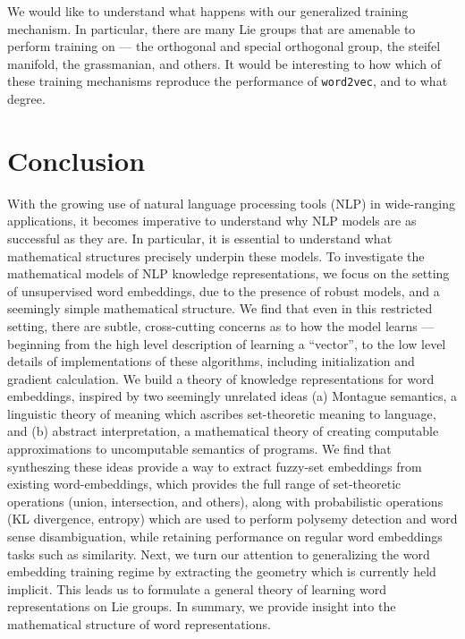 \documentclass[11pt]{book}
\begin{document}
We would like to understand what happens with our generalized training mechanism. In particular, there are many Lie groups that are amenable to perform training on --- the orthogonal and special orthogonal group, the steifel manifold, the grassmanian, and others. It would be interesting to how which of these training mechanisms reproduce the performance of \texttt{word2vec}, and to what degree.


\chapter{Conclusion}

With the growing use of natural language processing tools (NLP) in wide-ranging applications, it becomes imperative to understand why NLP models are as successful as they are. In particular, it is essential to understand what mathematical structures precisely underpin these models. To investigate the mathematical models of NLP knowledge representations, we focus on the setting of unsupervised word embeddings, due to the presence of robust models, and a seemingly simple mathematical structure. We find that even in this restricted setting, there are subtle, cross-cutting concerns as to how the model learns --- beginning from the high level description of learning a ``vector'', to the low level details of implementations of these algorithms, including initialization and gradient calculation. We build a theory of knowledge representations for word embeddings, inspired by two seemingly unrelated ideas (a) Montague semantics, a linguistic theory of meaning which ascribes set-theoretic meaning to language, and (b) abstract interpretation, a  mathematical theory of creating computable approximations to uncomputable semantics of programs. We find that syntheszing these ideas provide a way to extract fuzzy-set embeddings from existing word-embeddings, which provides the full range of set-theoretic operations (union, intersection, and others), along with probabilistic operations (KL divergence, entropy) which are used to perform polysemy detection and word sense disambiguation, while retaining performance on regular word embeddings tasks such as similarity. Next, we turn our attention to generalizing the word embedding training regime by extracting the geometry which is currently held implicit. This leads us to formulate a general theory of learning word representations on Lie groups. In summary, we provide insight into the mathematical structure of word representations. 
\end{document}
